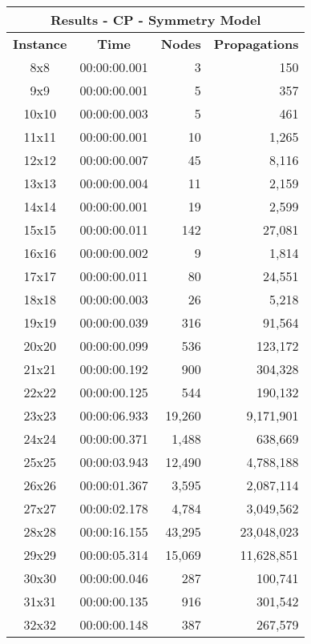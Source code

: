 
\begin{center}
    \begin{tabular}{|c|c|r|r|}
        \hline
        \multicolumn{4}{|c|}{\textbf{Results - CP - Symmetry Model}} \\
        \hline
        \textbf{Instance} & \textbf{Time} & \textbf{Nodes} & \textbf{Propagations} \\
        
        \hline
		8x8 & 00:00:00.001 & 3 & 150 \\ \hline
		9x9 & 00:00:00.001 & 5 & 357 \\ \hline
		10x10 & 00:00:00.003 & 5 & 461 \\ \hline
		11x11 & 00:00:00.001 & 10 & 1,265 \\ \hline
		12x12 & 00:00:00.007 & 45 & 8,116 \\ \hline
		13x13 & 00:00:00.004 & 11 & 2,159 \\ \hline
		14x14 & 00:00:00.001 & 19 & 2,599 \\ \hline
		15x15 & 00:00:00.011 & 142 & 27,081 \\ \hline
		16x16 & 00:00:00.002 & 9 & 1,814 \\ \hline
		17x17 & 00:00:00.011 & 80 & 24,551 \\ \hline
		18x18 & 00:00:00.003 & 26 & 5,218 \\ \hline
		19x19 & 00:00:00.039 & 316 & 91,564 \\ \hline
		20x20 & 00:00:00.099 & 536 & 123,172 \\ \hline
		21x21 & 00:00:00.192 & 900 & 304,328 \\ \hline
		22x22 & 00:00:00.125 & 544 & 190,132 \\ \hline
		23x23 & 00:00:06.933 & 19,260 & 9,171,901 \\ \hline
		24x24 & 00:00:00.371 & 1,488 & 638,669 \\ \hline
		25x25 & 00:00:03.943 & 12,490 & 4,788,188 \\ \hline
		26x26 & 00:00:01.367 & 3,595 & 2,087,114 \\ \hline
		27x27 & 00:00:02.178 & 4,784 & 3,049,562 \\ \hline
		28x28 & 00:00:16.155 & 43,295 & 23,048,023 \\ \hline
		29x29 & 00:00:05.314 & 15,069 & 11,628,851 \\ \hline
		30x30 & 00:00:00.046 & 287 & 100,741 \\ \hline
		31x31 & 00:00:00.135 & 916 & 301,542 \\ \hline
		32x32 & 00:00:00.148 & 387 & 267,579 \\ \hline

\end{tabular}
\end{center}
